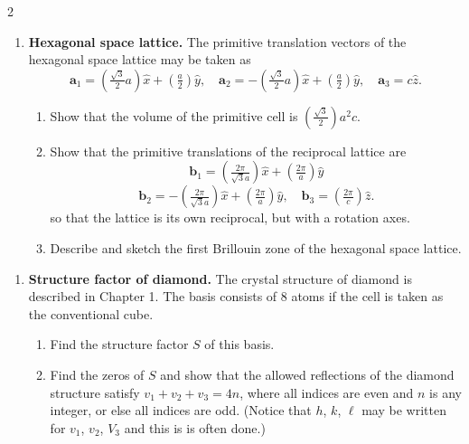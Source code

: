 \documentclass{article}
\begin{document}
\begin{multicols}{2}
\begin{enumerate}[label={{\textcolor{trueblue}{\textbf{Ej}. \arabic*.0}}}, start=3]
    \item \textbf{Hexagonal space lattice.} The primitive translation vectors of the hexagonal space lattice may be taken as
    \[
    \mathbf{a}_1 = \left(\tfrac{\sqrt{3}}{2}a\right)\hat{x} + \left(\tfrac{a}{2}\right)\hat{y}, 
    \quad \mathbf{a}_2 = -\left(\tfrac{\sqrt{3}}{2}a\right)\hat{x} + \left(\tfrac{a}{2}\right)\hat{y}, 
    \quad \mathbf{a}_3 = c \hat{z}.
    \]
    \begin{enumerate}[label=(\alph*)]
        \item Show that the volume of the primitive cell is $\left(\tfrac{\sqrt{3}}{2}\right)a^2c$.  
        \item Show that the primitive translations of the reciprocal lattice are  
        \[
        \mathbf{b}_1 = \left(\tfrac{2\pi}{\sqrt{3}a}\right)\hat{x} + \left(\tfrac{2\pi}{a}\right)\hat{y}\]
        \[\mathbf{b}_2 = -\left(\tfrac{2\pi}{\sqrt{3}a}\right)\hat{x} + \left(\tfrac{2\pi}{a}\right)\hat{y}, 
        \quad \mathbf{b}_3 = \left(\tfrac{2\pi}{c}\right)\hat{z}.
        \]
        so that the lattice is its own reciprocal, but with a rotation axes.
        \item Describe and sketch the first Brillouin zone of the hexagonal space lattice.
    \end{enumerate}
\end{enumerate}

\begin{enumerate}[label={{\textcolor{trueblue}{\textbf{Ej}. \arabic*.0}}}, start=4]
    \item \textbf{Structure factor of diamond.} The crystal structure of diamond is described in Chapter 1. The basis consists of 8 atoms if the cell is taken as the conventional cube.  
    \begin{enumerate}[label=(\alph*)]
        \item Find the structure factor $S$ of this basis.  
        \item Find the zeros of $S$ and show that the allowed reflections of the diamond structure satisfy $v_1+v_2+v_3=4n$, where all indices are even and $n$ is any integer, or else all indices are odd. (Notice that $h$, $k$, $\ell$ may be written for $v_{1}$, $v_{2}$, $V_{3}$ and this is is often done.)
    \end{enumerate}
\end{enumerate}


\end{multicols}
\end{document}
